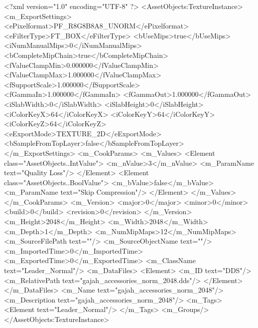 <?xml version="1.0" encoding="UTF-8" ?>
<AssetObjects:TextureInstance>
<m_ExportSettings>
<ePixelformat>PF_R8G8B8A8_UNORM</ePixelformat>
<eFilterType>FT_BOX</eFilterType>
<bUseMips>true</bUseMips>
<iNumManualMips>0</iNumManualMips>
<bCompleteMipChain>true</bCompleteMipChain>
<fValueClampMin>0.000000</fValueClampMin>
<fValueClampMax>1.000000</fValueClampMax>
<fSupportScale>1.000000</fSupportScale>
<fGammaIn>1.000000</fGammaIn>
<fGammaOut>1.000000</fGammaOut>
<iSlabWidth>0</iSlabWidth>
<iSlabHeight>0</iSlabHeight>
<iColorKeyX>64</iColorKeyX>
<iColorKeyY>64</iColorKeyY>
<iColorKeyZ>64</iColorKeyZ>
<eExportMode>TEXTURE_2D</eExportMode>
<bSampleFromTopLayer>false</bSampleFromTopLayer>
</m_ExportSettings>
<m_CookParams>
<m_Values>
<Element class="AssetObjects..IntValue">
<m_nValue>3</m_nValue>
<m_ParamName text="Quality Loss"/>
</Element>
<Element class="AssetObjects..BoolValue">
<m_bValue>false</m_bValue>
<m_ParamName text="Skip Compression"/>
</Element>
</m_Values>
</m_CookParams>
<m_Version>
<major>0</major>
<minor>0</minor>
<build>0</build>
<revision>0</revision>
</m_Version>
<m_Height>2048</m_Height>
<m_Width>2048</m_Width>
<m_Depth>1</m_Depth>
<m_NumMipMaps>12</m_NumMipMaps>
<m_SourceFilePath text=""/>
<m_SourceObjectName text=""/>
<m_ImportedTime>0</m_ImportedTime>
<m_ExportedTime>0</m_ExportedTime>
<m_ClassName text="Leader_Normal"/>
<m_DataFiles>
<Element>
<m_ID text="DDS"/>
<m_RelativePath text="gajah_accessories_norm_2048.dds"/>
</Element>
</m_DataFiles>
<m_Name text="gajah_accessories_norm_2048"/>
<m_Description text="gajah_accessories_norm_2048"/>
<m_Tags>
<Element text="Leader_Normal"/>
</m_Tags>
<m_Groups/>
</AssetObjects:TextureInstance>
